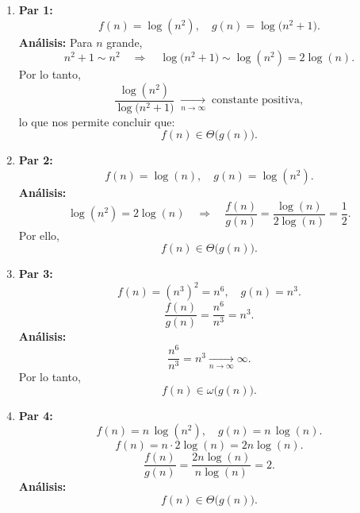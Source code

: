 \documentclass[12pt]{article}
\begin{document}
\begin{enumerate}

  \item \textbf{Par 1:} 
  \[
    f(n) = \log(n^2), \quad g(n) = \log\bigl(n^2 + 1\bigr).
  \]
  \textbf{Análisis:} Para \(n\) grande,
  \[
    n^2 + 1 \sim n^2 \quad \Longrightarrow \quad \log\bigl(n^2 + 1\bigr) \sim \log(n^2) = 2\log(n).
  \]
  Por lo tanto,
  \[
    \frac{\log(n^2)}{\log\bigl(n^2 + 1\bigr)} \; \xrightarrow[n \to \infty]{} \; \text{constante positiva},
  \]
  lo que nos permite concluir que:
  \[
    f(n) \in \Theta\bigl(g(n)\bigr).
  \]

  \item \textbf{Par 2:} 
  \[
    f(n) = \log(n), \quad g(n) = \log(n^2).
  \]
  \textbf{Análisis:}
  \[
    \log(n^2)= 2\log(n) \quad \Longrightarrow \quad \frac{f(n)}{g(n)} = \frac{\log(n)}{2\log(n)} = \frac{1}{2}.
  \]
  Por ello,
  \[
    f(n) \in \Theta\bigl(g(n)\bigr).
  \]

  \item \textbf{Par 3:} 
  \[
    f(n) = (n^3)^2 = n^6, \quad g(n) = n^3.
  \]
  \[
    \frac{f(n)}{g(n)} = \frac{n^6}{n^3} = n^3.
  \]
  \textbf{Análisis:}
  \[
    \frac{n^6}{n^3} = n^3 \xrightarrow[n \to \infty]{} \infty.
  \]
  Por lo tanto,
  \[
    f(n) \in \omega\bigl(g(n)\bigr).
  \]

  \item \textbf{Par 4:} 
  \[
    f(n) = n \,\log(n^2), \quad g(n) = n \,\log(n).
  \]
  \[
    f(n) = n \cdot 2\log(n)= 2n\log(n).
  \]
  \[
    \frac{f(n)}{g(n)} = \frac{2n\log(n)}{n\log(n)} = 2.
  \]
  \textbf{Análisis:}
  \[
    f(n) \in \Theta\bigl(g(n)\bigr).
  \]


\end{enumerate}
\end{document}

